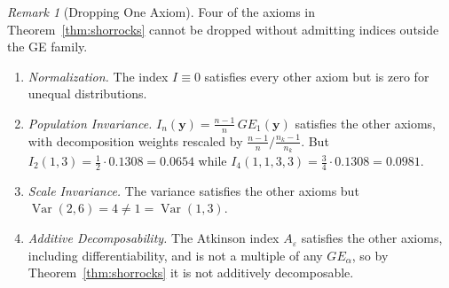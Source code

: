 \documentclass[12pt]{article}
\theoremstyle{plain}
\theoremstyle{definition}
\theoremstyle{remark}
\newtheorem{remark}[theorem]{Remark}
\newcommand{\bfy}{\mathbf{y}}
\begin{document}
\begin{remark}[Dropping One Axiom]\label{rem:independence}
Four of the axioms in Theorem~\ref{thm:shorrocks} cannot be dropped without admitting indices outside the GE family.
\begin{enumerate}[label=(\roman*)]
    \item \emph{Normalization.}
    The index $I \equiv 0$ satisfies every other axiom but is zero for unequal distributions.

    \item \emph{Population Invariance.}
    $I_n(\bfy) = \frac{n-1}{n}\,GE_1(\bfy)$ satisfies the other axioms, with decomposition weights rescaled by $\frac{n-1}{n} \big/ \frac{n_k - 1}{n_k}$.
    But $I_2(1,3) = \frac{1}{2} \cdot 0.1308 = 0.0654$ while $I_4(1,1,3,3) = \frac{3}{4} \cdot 0.1308 = 0.0981$.

    \item \emph{Scale Invariance.}
    The variance satisfies the other axioms but $\operatorname{Var}(2,6) = 4 \neq 1 = \operatorname{Var}(1,3)$.

    \item \emph{Additive Decomposability.}
    The Atkinson index $A_\varepsilon$ satisfies the other axioms, including differentiability, and is not a multiple of any $GE_\alpha$, so by Theorem~\ref{thm:shorrocks} it is not additively decomposable.
\end{enumerate}
\end{remark}
\end{document}

